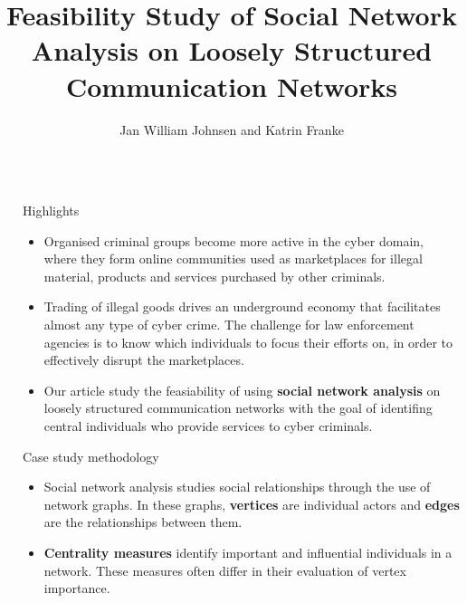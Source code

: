 \documentclass[hyperref={pdfpagelabels=false}]{beamer}
\title{\Huge{Feasibility Study of Social Network Analysis on Loosely Structured Communication Networks}}
\author{Jan William Johnsen and Katrin Franke}
\institute{jan.w.johnsen@ieee.org and kyfranke@ieee.org}
\begin{document}

\begin{frame}[fragile] %


\begin{columns}[t]

\begin{column}{.052\textwidth}\end{column} %

\begin{column}{.45\textwidth} %

\begin{block}{Highlights}
  \begin{itemize}
    \item Organised criminal groups become more active in the cyber domain, where they form online communities used as marketplaces for illegal material, products and services purchased by other criminals.
    \item Trading of illegal goods drives an underground economy that facilitates almost any type of cyber crime. The challenge for law enforcement agencies is to know which individuals to focus their efforts on, in order to effectively disrupt the marketplaces.
    \item Our article study the feasiability of using \textbf{social network analysis} on loosely structured communication networks with the goal of identifing central individuals who provide services to cyber criminals.
  \end{itemize}
\end{block}


\begin{block}{Case study methodology}
  \begin{itemize}
    \item Social network analysis studies social relationships through the use of network graphs. In these graphs, \textbf{vertices} are individual actors and \textbf{edges} are the relationships between them.
    \item \textbf{Centrality measures} identify important and influential individuals in a network. These measures often differ in their evaluation of vertex importance.
  \end{itemize}


\end{block}
\end{column}
\end{columns}
\end{frame}
\end{document}
